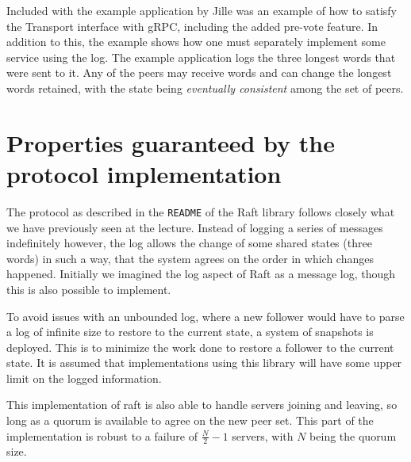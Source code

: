 \documentclass[a4paper,11pt]{article}
\begin{document}
\noindent Included with the example application by Jille was an example of how to satisfy the Transport interface with gRPC, including the added pre-vote feature. In addition to this, the example shows how one must separately implement some service using the log. The example application logs the three longest words that were sent to it. Any of the peers may receive words and can change the longest words retained, with the state being \textit{eventually consistent} among the set of peers. 

\section{Properties guaranteed by the protocol implementation}

The protocol as described in the \texttt{README} of the Raft library follows closely what we have previously seen at the lecture. Instead of logging a series of messages indefinitely however, the log allows the change of some shared states (three words) in such a way, that the system agrees on the order in which changes happened. Initially we imagined the log aspect of Raft as a message log, though this is also possible to implement. 

\bigbreak \noindent To avoid issues with an unbounded log, where a new follower would have to parse a log of infinite size to restore to the current state, a system of snapshots is deployed. This is to minimize the work done to restore a follower to the current state. It is assumed that implementations using this library will have some upper limit on the logged information. 

\bigbreak \noindent This implementation of raft is also able to handle servers joining and leaving, so long as a quorum is available to agree on the new peer set. This part of the implementation is robust to a failure of $\frac{N}{2} - 1$ servers, with $N$ being the quorum size. 
\end{document}
